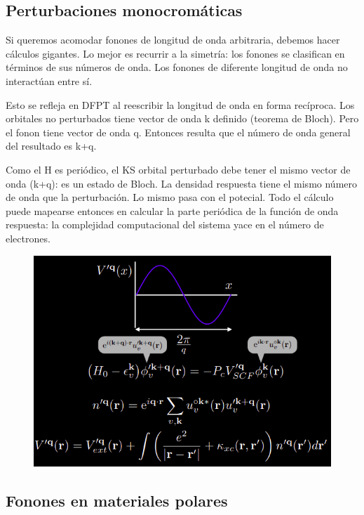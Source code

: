 \subsection{Perturbaciones monocromáticas}

  Si queremos acomodar fonones de longitud de onda arbitraria, debemos hacer cálculos gigantes. Lo mejor es recurrir a la simetría: los fonones se clasifican en términos de sus números de onda. Los fonones de diferente longitud de onda no interactúan entre sí.

  Esto se refleja en DFPT al reescribir la longitud de onda en forma recíproca. Los orbitales no perturbados tiene vector de onda k definido (teorema de Bloch). Pero el fonon tiene vector de onda q. Entonces resulta que el número de onda general del resultado es k+q.

  Como el H es periódico, el KS orbital perturbado debe tener el mismo vector de onda (k+q): es un estado de Bloch. La densidad respuesta tiene el mismo número de onda que la perturbación. Lo mismo pasa con el potecial. Todo el cálculo puede mapearse entonces en calcular la parte periódica de la función de onda respuesta: la complejidad computacional del sistema yace en el número de electrones.

  \begin{figure}[H]
    \centering
    \includegraphics[scale = 0.6]{figs/D5/monocrom.png}
  \end{figure}

\subsection{Fonones en materiales polares}

